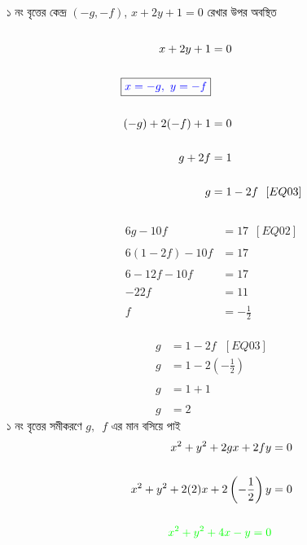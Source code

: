 \documentclass{article}
\begin{document}
\\
১ নং বৃত্তের কেন্দ্র $(-g,-f)$, $x+2y+1=0$ রেখার উপর অবস্থিত \\
\\
\begin{align*}
	x+2y+1&=0\\
	\\
		\boxed{\textcolor{blue}{x=-g,\,\,y=-f}}&\\
		\\
		(-g)+2(-f)+1&=0\\
		\\
		g+2f&=1\\
		\\
		g&=1-2f\,\,\,\,[EQ03]
\end{align*}
\\
\begin{align*}
6g-10f&=17\,\,\,[EQ02]\\
\\
6(1-2f)-10f&=17\\
\\
6-12f-10f&=17\\
\\
-22f&=11\\
\\
f&=-\frac{1}{2}
\end{align*}
\\
\begin{align*}
	g&=1-2f\,\,\,\,[EQ03]
	\\
		g&=1-2\left(-\frac{1}{2}\right)\\
		\\
		g&=1+1\\
		\\
		g&=2
\end{align*}
১ নং বৃত্তের সমীকরণে $g,\,\,\,f$ এর মান বসিয়ে পাই 
\\
\begin{align*}
	x^2+y^2+2gx+2fy&=0\\
	\\
		x^2+y^2+2(2)x+2\left(-\frac{1}{2}\right)y&=0\\
		\\
	\textcolor{green}{x^2+y^2+4x-y=0}&	
\end{align*}
\end{document}
